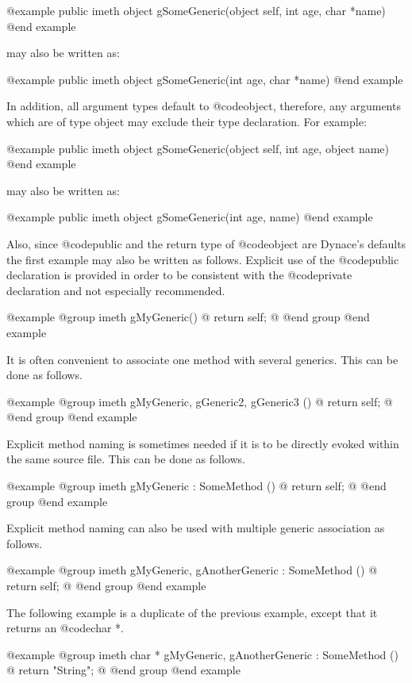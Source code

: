 @example
public  imeth   object  gSomeGeneric(object self, int age, char *name)
@end example

may also be written as:

@example
public  imeth   object  gSomeGeneric(int age, char *name)
@end example


In addition, all argument types default to @code{object}, therefore,
any arguments which are of type object may exclude their type
declaration.  For example:

@example
public  imeth   object  gSomeGeneric(object self, int age, object name)
@end example

may also be written as:

@example
public  imeth   object  gSomeGeneric(int age, name)
@end example


Also, since @code{public} and the return type of @code{object} are
Dynace's defaults the first example may also be written as follows.
Explicit use of the @code{public} declaration is provided in order to
be consistent with the @code{private} declaration and not especially
recommended.

@example
@group
imeth   gMyGeneric()
@{
        return self;
@}
@end group
@end example




It is often convenient to associate one method with several generics.
This can be done as follows.

@example
@group
imeth   gMyGeneric, gGeneric2, gGeneric3 ()
@{
        return self;
@}
@end group
@end example


Explicit method naming is sometimes needed if it is to be directly
evoked within the same source file.  This can be done as follows.


@example
@group
imeth   gMyGeneric : SomeMethod ()
@{
        return self;
@}
@end group
@end example



Explicit method naming can also be used with multiple generic
association as follows.

@example
@group
imeth   gMyGeneric, gAnotherGeneric : SomeMethod ()
@{
        return self;
@}
@end group
@end example





The following example is a duplicate of the previous example, except
that it returns an @code{char *}.

@example
@group
imeth   char * gMyGeneric, gAnotherGeneric : SomeMethod ()
@{
        return "String";
@}
@end group
@end example


